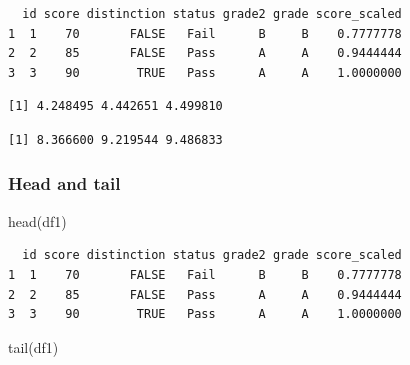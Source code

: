 \documentclass[
  letterpaper,
  DIV=11,
  numbers=noendperiod]{scrartcl}
\newenvironment{Shaded}{\begin{snugshade}}{\end{snugshade}}
\newcommand{\FunctionTok}[1]{\textcolor[rgb]{0.28,0.35,0.67}{#1}}
\newcommand{\NormalTok}[1]{\textcolor[rgb]{0.00,0.23,0.31}{#1}}
\newcommand{\SpecialCharTok}[1]{\textcolor[rgb]{0.37,0.37,0.37}{#1}}
\begin{document}
\begin{verbatim}
  id score distinction status grade2 grade score_scaled
1  1    70       FALSE   Fail      B     B    0.7777778
2  2    85       FALSE   Pass      A     A    0.9444444
3  3    90        TRUE   Pass      A     A    1.0000000
\end{verbatim}

\begin{Shaded}
\end{Shaded}

\begin{verbatim}
[1] 4.248495 4.442651 4.499810
\end{verbatim}

\begin{Shaded}
\end{Shaded}

\begin{verbatim}
[1] 8.366600 9.219544 9.486833
\end{verbatim}

\subsubsection{Head and tail}\label{head-and-tail}

\begin{Shaded}
\begin{Highlighting}[]
\FunctionTok{head}\NormalTok{(df1)}
\end{Highlighting}
\end{Shaded}

\begin{verbatim}
  id score distinction status grade2 grade score_scaled
1  1    70       FALSE   Fail      B     B    0.7777778
2  2    85       FALSE   Pass      A     A    0.9444444
3  3    90        TRUE   Pass      A     A    1.0000000
\end{verbatim}

\begin{Shaded}
\begin{Highlighting}[]
\FunctionTok{tail}\NormalTok{(df1)}
\end{Highlighting}
\end{Shaded}
\end{document}

